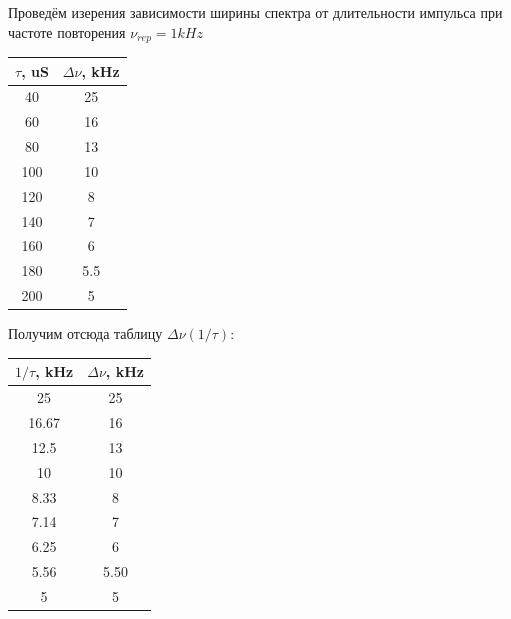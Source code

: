 \documentclass{article}
\begin{document}
Проведём изерения зависимости ширины спектра от длительности импульса при частоте повторения \( \nu_{rep} = 1kHz \)

\begin{table}[H]
    \centering
    \label{tab_dnu_tau}
    \begin{tabular}{|c|c|}
        \hline
        \(\tau\), uS & \(\Delta\nu\), kHz \\\hline
        40                        & 25                  \\\hline
        60                        & 16                  \\\hline
        80                        & 13                  \\\hline
        100                       & 10                  \\\hline
        120                       & 8                   \\\hline
        140                       & 7                   \\\hline
        160                       & 6                   \\\hline
        180                       & 5.5                \\\hline
        200                       & 5                   \\\hline
    \end{tabular}
\end{table}

Получим отсюда таблицу \( \Delta\nu(1/\tau) \):


\begin{table}[H]
    \centering
    \label{tab_dnu_tau}
    \begin{tabular}{|c|c|}
        \hline
        \(1/\tau\), kHz & \(\Delta\nu\), kHz \\\hline
        25    & 25   \\\hline
        16.67 & 16   \\\hline
        12.5  & 13   \\\hline
        10    & 10   \\\hline
        8.33  & 8    \\\hline
        7.14  & 7    \\\hline
        6.25  & 6    \\\hline
        5.56  & 5.50 \\\hline
        5     & 5   \\\hline
    \end{tabular}
\end{table}
\end{document}
